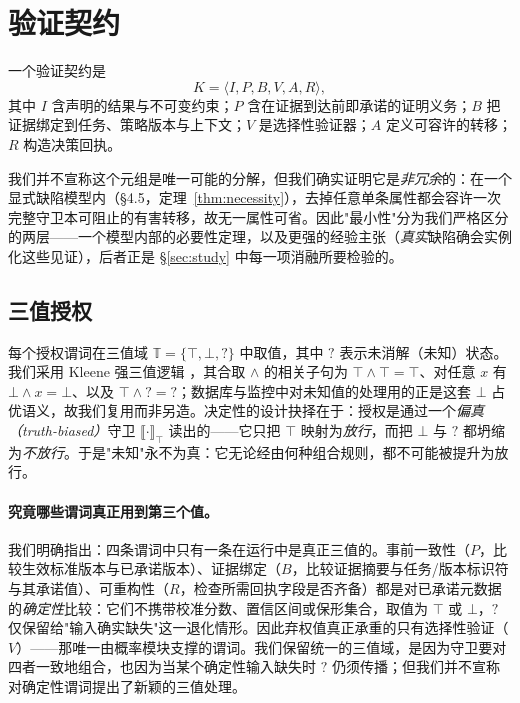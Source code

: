 \documentclass[11pt]{ctexart}
\begin{document}
\section{验证契约}
一个验证契约是
\begin{equation}
K=\langle I,P,B,V,A,R\rangle,
\end{equation}
其中 $I$ 含声明的结果与不可变约束；$P$ 含在证据到达前即承诺的证明义务；$B$ 把证据绑定到任务、策略版本与上下文；$V$ 是选择性验证器；$A$ 定义可容许的转移；$R$ 构造决策回执。

我们并不宣称这个元组是唯一可能的分解，但我们确实证明它是\emph{非冗余}的：在一个显式缺陷模型内（\S4.5，定理~\ref{thm:necessity}），去掉任意单条属性都会容许一次完整守卫本可阻止的有害转移，故无一属性可省。因此"最小性"分为我们严格区分的两层——一个模型内部的必要性定理，以及更强的经验主张（\emph{真实}缺陷确会实例化这些见证），后者正是 \S\ref{sec:study} 中每一项消融所要检验的。

\subsection{三值授权}
每个授权谓词在三值域 $\mathbb{T}=\{\top,\bot,?\}$ 中取值，其中 $?$ 表示未消解（未知）状态。我们采用 Kleene 强三值逻辑 \cite{kleene1952metamathematics,fitting1994kleene}，其合取 $\land$ 的相关子句为 $\top\land\top=\top$、对任意 $x$ 有 $\bot\land x=\bot$、以及 $\top\land{?}={?}$；数据库与监控中对未知值的处理用的正是这套 $\bot$ 占优语义，故我们复用而非另造。决定性的设计抉择在于：授权是通过一个\emph{偏真（truth-biased）}守卫 $\llbracket\cdot\rrbracket_\top$ 读出的——它只把 $\top$ 映射为\emph{放行}，而把 $\bot$ 与 $?$ 都坍缩为\emph{不放行}。于是"未知"永不为真：它无论经由何种组合规则，都不可能被提升为放行。

\paragraph{究竟哪些谓词真正用到第三个值。} 我们明确指出：四条谓词中只有一条在运行中是真正三值的。事前一致性（$P$，比较生效标准版本与已承诺版本）、证据绑定（$B$，比较证据摘要与任务/版本标识符与其承诺值）、可重构性（$R$，检查所需回执字段是否齐备）都是对已承诺元数据的\emph{确定性}比较：它们不携带校准分数、置信区间或保形集合，取值为 $\top$ 或 $\bot$，$?$ 仅保留给"输入确实缺失"这一退化情形。因此弃权值真正承重的只有选择性验证（$V$）——那唯一由概率模块支撑的谓词。我们保留统一的三值域，是因为守卫要对四者一致地组合，也因为当某个确定性输入缺失时 $?$ 仍须传播；但我们并不宣称对确定性谓词提出了新颖的三值处理。
\end{document}
